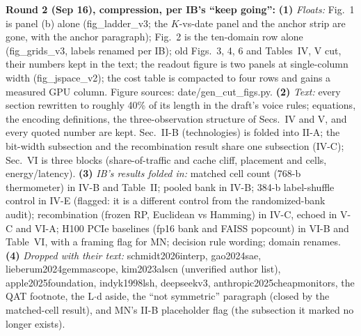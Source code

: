 \documentclass[conference]{IEEEtran}
\begin{document}
{\begin{pnote}[aiviolet]
\textbf{Round 2 (Sep 16), compression, per IB's ``keep going'':}
{\bf (1)} \emph{Floats:} Fig.~1 is panel (b) alone (fig\_ladder\_v3;
the $K$-vs-date panel and the anchor strip are gone, with the anchor
paragraph); Fig.~2 is the ten-domain row alone (fig\_grids\_v3, labels
renamed per IB); old Figs.~3, 4, 6 and Tables~IV, V cut, their numbers
kept in the text; the readout figure is two panels at single-column
width (fig\_jspace\_v2); the cost table is compacted to four rows and
gains a measured GPU column. Figure sources: date/gen\_cut\_figs.py.
{\bf (2)} \emph{Text:} every section rewritten to roughly 40\% of its
length in the draft's voice rules; equations, the encoding
definitions, the three-observation structure of Secs.~IV and V, and
every quoted number are kept. Sec.~II-B (technologies) is folded into
II-A; the bit-width subsection and the recombination result share one
subsection (IV-C); Sec.~VI is three blocks (share-of-traffic and
cache cliff, placement and cells, energy/latency).
{\bf (3)} \emph{IB's results folded in:} matched cell count (768-b
thermometer) in IV-B and Table~II; pooled bank in IV-B; 384-b
label-shuffle control in IV-E (flagged: it is a different control from
the randomized-bank audit); recombination (frozen RP, Euclidean vs
Hamming) in IV-C, echoed in V-C and VI-A; H100 PCIe baselines (fp16
bank and FAISS popcount) in VI-B and Table~VI, with a framing flag for
MN; decision rule wording; domain renames.
{\bf (4)} \emph{Dropped with their text:} schmidt2026interp,
gao2024sae, lieberum2024gemmascope, kim2023alscn (unverified author
list), apple2025foundation, indyk1998lsh, deepseekv3,
anthropic2025cheapmonitors, the QAT footnote, the L$\cdot$d aside, the
``not symmetric'' paragraph (closed by the matched-cell result), and
MN's II-B placeholder flag (the subsection it marked no longer
exists).
\end{pnote}
}
\end{document}
